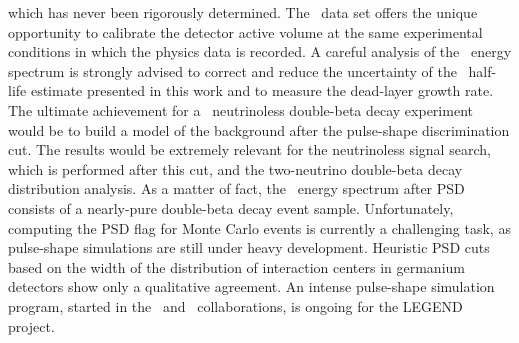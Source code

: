 which has never been rigorously determined. The \Arl\ data set offers the unique
opportunity to calibrate the detector active volume at the same experimental conditions in
which the physics data is recorded. A careful analysis of the \Arl\ energy spectrum is
strongly advised to correct and reduce the uncertainty of the \nnbb\ half-life estimate
presented in this work and to measure the dead-layer growth rate.
\newpar
The ultimate achievement for a \gesix\ neutrinoless double-beta decay experiment would be
to build a model of the background after the pulse-shape discrimination cut. The results
would be extremely relevant for the neutrinoless signal search, which is performed after
this cut, and the two-neutrino double-beta decay distribution analysis. As a matter of
fact, the \gerda\ energy spectrum after PSD consists of a nearly-pure double-beta decay
event sample. Unfortunately, computing the PSD flag for Monte Carlo events is currently a
challenging task, as pulse-shape simulations are still under heavy development. Heuristic
PSD cuts based on the width of the distribution of interaction centers in germanium
detectors show only a qualitative agreement. An intense pulse-shape simulation program,
started in the \gerda\ and \majorana\ collaborations, is ongoing for the LEGEND project.

\chapendgliph{}

